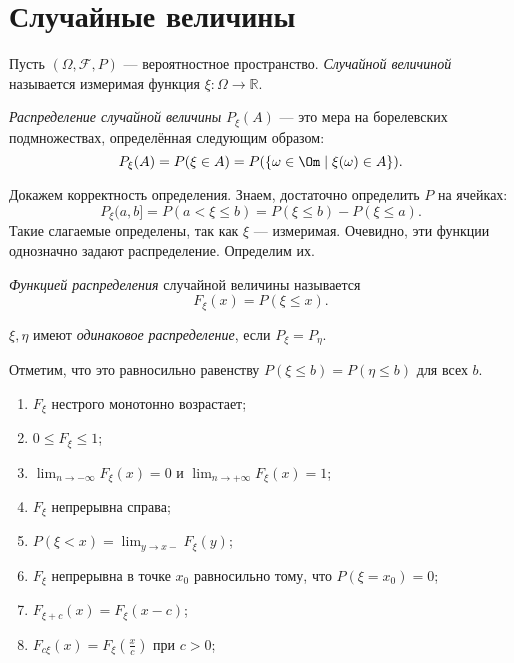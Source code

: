 \section{Случайные величины}

 \begin{definition}
     Пусть $(\Omega, \mathcal{F}, P) $ --- вероятностное пространство.
     \textit{Случайной величиной} называется измеримая функция $\xi\colon \Omega \rightarrow \mathbb{R}$.
 \end{definition}


 \begin{definition}\textit{Распределение случайной величины} $P_\xi(A)$ --- это мера на борелевских подмножествах, определённая следующим образом:
     $$P_\xi(A) = P(\xi \in A) =  P(\{\omega\in\Om\mid \xi(\omega) \in A\}).$$
 \end{definition}

Докажем корректность определения. Знаем, достаточно определить $P$ на ячейках: 
$$P_\xi(a, b] = P(a < \xi \le b) =
         P(\xi \le b) - P(\xi\le a).$$
Такие слагаемые определены, так как $\xi$ --- измеримая. Очевидно, эти функции однозначно задают распределение. Определим их.

\begin{definition} \textit{Функцией распределения} случайной величины называется 
     $$F_\xi(x) = P(\xi\le x).$$
 \end{definition}
 
 \begin{definition}
     $\xi, \eta$ имеют \textit{одинаковое распределение}, если $P_\xi = P_\eta$.
 \end{definition}

Отметим, что это равносильно равенству $P(\xi \le b) = P(\eta \le b)$  для всех $b$.

 \begin{properties}
 \enewline
     \begin{enumerate}
         \item $F_\xi$ нестрого монотонно возрастает;
         \item $0\le F_\xi \le 1$;
         \item ${\lim}_{n\rightarrow -\infty} F_\xi (x) = 0$ и ${\lim}_{n\rightarrow +\infty} F_\xi (x) = 1$;
         \item $F_\xi$ непрерывна справа;
         \item $P(\xi < x) = {\lim}_{y\rightarrow x-}  F_\xi(y)$;
         \item $F_\xi$ непрерывна в точке $x_0$ равносильно тому, что $P(\xi = x_0) = 0$;
         \item $F_{\xi + c} (x) = F_\xi (x - c)$;
         \item $F_{c\xi} (x) = F_\xi(\frac{x}{c})$ при  $c > 0$; \qedhere
     \end{enumerate}
 \end{properties}
 
